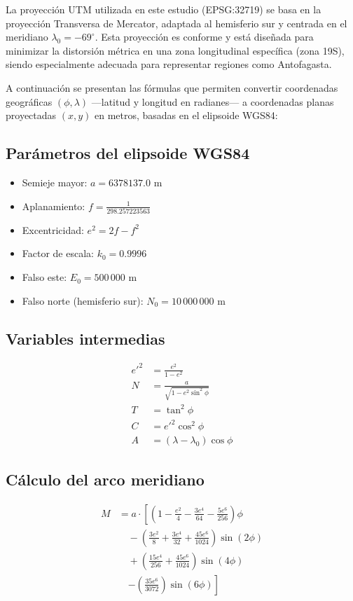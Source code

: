 \documentclass[12pt]{article}
\begin{document}
La proyección UTM utilizada en este estudio (EPSG:32719) se basa en la proyección Transversa de Mercator, adaptada al hemisferio sur y centrada en el meridiano $\lambda_0 = -69^\circ$. Esta proyección es conforme y está diseñada para minimizar la distorsión métrica en una zona longitudinal específica (zona 19S), siendo especialmente adecuada para representar regiones como Antofagasta.

A continuación se presentan las fórmulas que permiten convertir coordenadas geográficas $(\phi, \lambda)$ —latitud y longitud en radianes— a coordenadas planas proyectadas $(x, y)$ en metros, basadas en el elipsoide WGS84:

\subsection*{Parámetros del elipsoide WGS84}

\begin{itemize}
  \item Semieje mayor: $a = 6378137.0$ m
  \item Aplanamiento: $f = \frac{1}{298.257223563}$
  \item Excentricidad: $e^2 = 2f - f^2$
  \item Factor de escala: $k_0 = 0.9996$
  \item Falso este: $E_0 = 500\,000$ m
  \item Falso norte (hemisferio sur): $N_0 = 10\,000\,000$ m
\end{itemize}

\subsection*{Variables intermedias}

\begin{align*}
e'^2 &= \frac{e^2}{1 - e^2} \\
N &= \frac{a}{\sqrt{1 - e^2 \sin^2 \phi}} \\
T &= \tan^2 \phi \\
C &= e'^2 \cos^2 \phi \\
A &= (\lambda - \lambda_0) \cos \phi
\end{align*}

\subsection*{Cálculo del arco meridiano}

\begin{align*}
M &= a \cdot \left[
(1 - \frac{e^2}{4} - \frac{3e^4}{64} - \frac{5e^6}{256}) \phi \right. \\
&\quad - (\frac{3e^2}{8} + \frac{3e^4}{32} + \frac{45e^6}{1024}) \sin(2\phi) \\
&\quad + (\frac{15e^4}{256} + \frac{45e^6}{1024}) \sin(4\phi) \\
&\quad \left. - (\frac{35e^6}{3072}) \sin(6\phi)
\right]
\end{align*}
\end{document}
